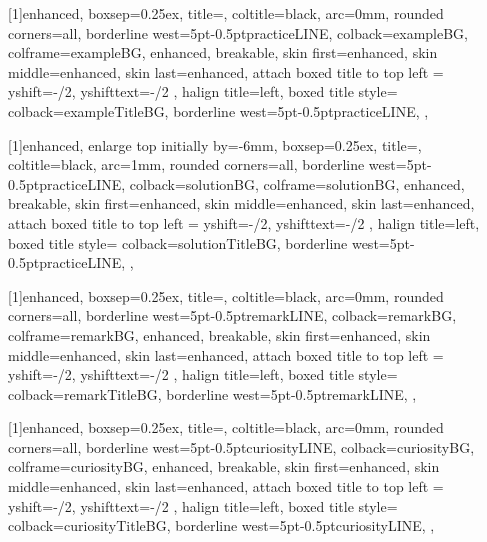 [1]{enhanced,
    boxsep=0.25ex,
    title=,
    coltitle=black,
    arc=0mm,
    rounded corners=all,
    borderline west={5pt}{-0.5pt}{practiceLINE},
    colback=exampleBG,
    colframe=exampleBG,
    enhanced,
    breakable,
    skin first=enhanced,
    skin middle=enhanced,
    skin last=enhanced,
    attach boxed title to top left ={
        yshift=-\tcboxedtitleheight/2,
        yshifttext=-\tcboxedtitleheight/2
    },
    halign title=left,
    boxed title style={%
        colback=exampleTitleBG,
        borderline west={5pt}{-0.5pt}{practiceLINE},
    },
}  %

[1]{enhanced,
    enlarge top initially by=-6mm,
    boxsep=0.25ex,
    title=,
    coltitle=black,
    arc=1mm,
    rounded corners=all,
    borderline west={5pt}{-0.5pt}{practiceLINE},
    colback=solutionBG,
    colframe=solutionBG,
    enhanced,
    breakable,
    skin first=enhanced,
    skin middle=enhanced,
    skin last=enhanced,
    attach boxed title to top left ={
        yshift=-\tcboxedtitleheight/2,
        yshifttext=-\tcboxedtitleheight/2
    },
    halign title=left,
    boxed title style={%
        colback=solutionTitleBG,
        borderline west={5pt}{-0.5pt}{practiceLINE},
    },
}  %

[1]{enhanced,
    boxsep=0.25ex,
    title=,
    coltitle=black,
    arc=0mm,
    rounded corners=all,
    borderline west={5pt}{-0.5pt}{remarkLINE},
    colback=remarkBG,
    colframe=remarkBG,
    enhanced,
    breakable,
    skin first=enhanced,
    skin middle=enhanced,
    skin last=enhanced,
    attach boxed title to top left ={
        yshift=-\tcboxedtitleheight/2,
        yshifttext=-\tcboxedtitleheight/2
    },
    halign title=left,
    boxed title style={%
        colback=remarkTitleBG,
        borderline west={5pt}{-0.5pt}{remarkLINE},
    },
}  %

[1]{enhanced,
    boxsep=0.25ex,
    title=,
    coltitle=black,
    arc=0mm,
    rounded corners=all,
    borderline west={5pt}{-0.5pt}{curiosityLINE},
    colback=curiosityBG,
    colframe=curiosityBG,
    enhanced,
    breakable,
    skin first=enhanced,
    skin middle=enhanced,
    skin last=enhanced,
    attach boxed title to top left ={
        yshift=-\tcboxedtitleheight/2,
        yshifttext=-\tcboxedtitleheight/2
    },
    halign title=left,
    boxed title style={%
        colback=curiosityTitleBG,
        borderline west={5pt}{-0.5pt}{curiosityLINE},
    },
}  %

